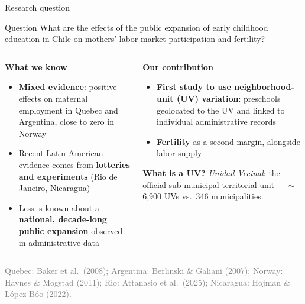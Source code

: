 \documentclass[aspectratio=169,10pt]{beamer}
\newcommand{\takeaway}[1]{\par\vspace{6pt}{\small\textcolor{steel}{$\Rightarrow$}\ \textbf{\textcolor{navy}{#1}}}}
\begin{document}
\begin{frame}{Research question}
\begin{block}{Question}
\small What are the effects of the public expansion of early childhood education in Chile on mothers' labor market participation and fertility?
\end{block}

\vspace{4pt}
\begin{columns}[T]
\begin{column}{0.49\textwidth}
{\small\textcolor{steel}{\textbf{What we know}}}
\begin{itemize}
  \footnotesize
  \item \textbf{Mixed evidence}: positive effects on maternal employment in Quebec and Argentina, close to zero in Norway
  \item Recent Latin American evidence comes from \textbf{lotteries and experiments} (Rio de Janeiro, Nicaragua)
  \item Less is known about a \textbf{national, decade-long public expansion} observed in administrative data
\end{itemize}
\end{column}
\begin{column}{0.49\textwidth}
{\small\textcolor{steel}{\textbf{Our contribution}}}
\begin{itemize}
  \footnotesize
  \item \textbf{First study to use neighborhood-unit (UV) variation}: preschools geolocated to the UV and linked to individual administrative records
  \item \textbf{Fertility} as a second margin, alongside labor supply
\end{itemize}

\vspace{4pt}
\colorbox{bgpanel}{\parbox{0.95\linewidth}{\raggedright\footnotesize \textbf{\textcolor{steel}{What is a UV?}} \emph{Unidad Vecinal}: the official sub-municipal territorial unit --- $\sim$6{,}900 UVs vs.\ 346 municipalities.}}
\end{column}
\end{columns}

\takeaway{Finer geography: a sharper measure of exposure and more variation to identify the effect.}
\par\vspace{10pt}
{\tiny\textcolor{graytext}{Quebec: Baker et al.\ (2008); Argentina: Berlinski \& Galiani (2007); Norway: Havnes \& Mogstad (2011); Rio: Attanasio et al.\ (2025); Nicaragua: Hojman \& L\'opez B\'oo (2022).}\par}
\end{frame}
\end{document}
